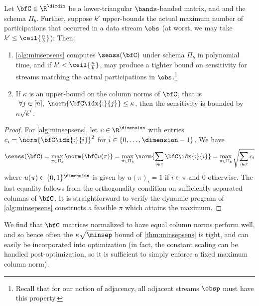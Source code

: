 \newcommand{\indpi}{u(\pi)}

\begin{theorem}\label{thm:minsepsens}
Let $\bfC \in \R^\dimdim$ be a lower-triangular $\bands$-banded matrix, and and the \bparticipation schema $\Pi_b$.  Further, suppose $k'$ upper-bounds the actual maximum number of participations that occurred in a data stream $\obs$ (at worst, we may take $k' \le \ceil{\frac{n}{b}}$):
Then:
\begin{enumerate}
\item \cref{alg:minsepsens} computes $\senss(\bfC)$ under schema $\Pi_b$ in polynomial time, and if $k' < \ceil{\frac{n}{b}}$, may produce a tighter bound on sensitivity for streams matching the actual participations in $\obs$.\footnote{Recall that for our notion of adjacency, all adjacent streams $\obsp$ must have this property.}
\item If $\kappa$ is an upper-bound on the column norms of $\bfC$, that is $\ \forall j \in [n], \ \norm{\bfC\idx{:}{j}} \le \kappa$, then the sensitivity is bounded by $\kappa \sqrt{k'}$.
\end{enumerate}
\end{theorem}
%
\begin{proof}
For \cref{alg:minsepsens}, let $\vals \in \R^\dimension$ with entries $\vals_i = \norm{\bfC\idx{:}{i}}^2$ for $i \in \{0, \dots, \dimension-1\}$. We have
\begin{equation}\label{eq:orthcolnorm}
\senss(\bfC) 
  = \max_{\pi \in \Pi_b} \norm{\bfC \indpi} 
  = \max_{\pi \in \Pi_b} \norm{\sum_{i \in \pi} \bfC\idx{:}{i}}  
  = \max_{\pi \in \Pi_b} \sqrt{\sum_{i \in \pi} c_i}
\end{equation}
where $\indpi \in \{0, 1\}^\dimension$ is given by $\indpi_i = 1$ if $i \in \pi$ and $0$ otherwise. The last equality follows from the orthogonality condition on sufficiently separated columns of $\bfC$. It is straightforward to verify the dynamic program of \cref{alg:minsepsens} constructs a feasible $\pi$ which attains the maximum.
\end{proof}

We find that $\bfC$ matrices normalized to have equal column norms perform well, and so hence often the $\kappa \sqrt{\minsep}$ bound of \cref{thm:minsepsens} is tight, and can easily be incorporated into optimization (in fact, the constant scaling can be handled post-optimization, so it is sufficient to simply enforce a fixed maximum column norm).